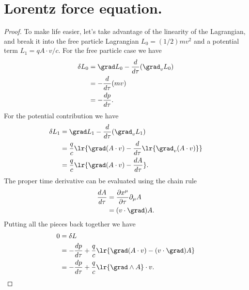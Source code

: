 \section{Lorentz force equation.}
\begin{proof}
To make life easier, let's take advantage of the linearity of the Lagrangian, and break it into the free particle Lagrangian \( L_0 = (1/2) m v^2 \) and a potential term \( L_1 = q A \cdot v/c \).  For the free particle case we have
\begin{equation}\label{eqn:lorentzForceCovariant:240}
\begin{aligned}
\delta L_0
&= \grad L_0 - \frac{d}{d\tau} (\grad_v L_0) \\
&=           - \frac{d}{d\tau} (m v) \\
&= - \frac{dp}{d\tau}.
\end{aligned}
\end{equation}
For the potential contribution we have
\begin{equation}\label{eqn:lorentzForceCovariant:260}
\begin{aligned}
\delta L_1
&= \grad L_1 - \frac{d}{d\tau} (\grad_v L_1) \\
&= \frac{q}{c} \lr{ \grad (A \cdot v) - \frac{d}{d\tau} \lr{ \grad_v (A \cdot v)} } \\
&= \frac{q}{c} \lr{ \grad (A \cdot v) - \frac{dA}{d\tau} }.
\end{aligned}
\end{equation}
The proper time derivative can be evaluated using the chain rule
\begin{equation}\label{eqn:lorentzForceCovariant:280}
\begin{aligned}
\frac{dA}{d\tau}
&= \frac{\partial x^\mu}{\partial \tau} \partial_\mu A \\
&= (v \cdot \grad) A.
\end{aligned}
\end{equation}
Putting all the pieces back together we have
\begin{equation}\label{eqn:lorentzForceCovariant:300}
\begin{aligned}
0 
&= \delta L \\
&= -\frac{dp}{d\tau} + \frac{q}{c} \lr{ \grad (A \cdot v) -  (v \cdot \grad) A } \\
&= -\frac{dp}{d\tau} + \frac{q}{c} \lr{ \grad \wedge A } \cdot v.
\end{aligned}
\end{equation}
\end{proof}
